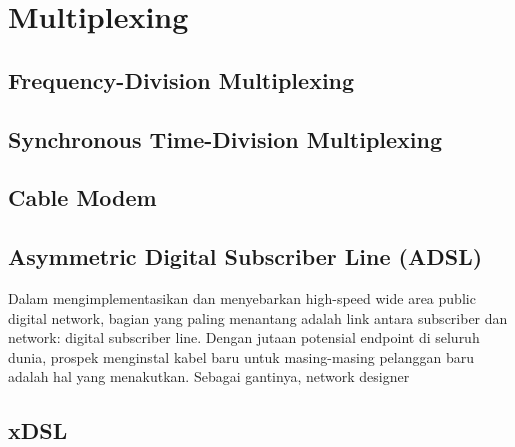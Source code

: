 \chapter{Multiplexing}

\section{Frequency-Division Multiplexing}

\section{Synchronous Time-Division Multiplexing}

\section{Cable Modem}

\section{Asymmetric Digital Subscriber Line (ADSL)}

Dalam mengimplementasikan dan menyebarkan high-speed wide area public digital network, bagian yang paling menantang adalah link antara subscriber dan network: digital subscriber line. Dengan jutaan potensial endpoint di seluruh dunia, prospek menginstal kabel baru untuk masing-masing pelanggan baru adalah hal yang menakutkan. Sebagai gantinya, network designer


\section{xDSL}